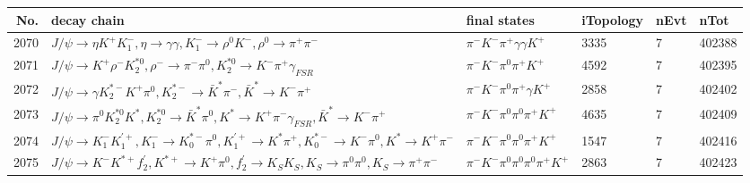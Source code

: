 \begin{table}[htbp] 
\begin{center}
\begin{small}
\begin{tabular}{rlllll}\hline\hline
 No. & decay chain & final states &  iTopology & nEvt & nTot \\\hline
2070&$J/\psi       \rightarrow \eta          K^{+}          K_{1}^{-}      , \eta           \rightarrow \gamma       \gamma       , K_{1}^{-}       \rightarrow \rho^{0}      K^{-}          , \rho^{0}       \rightarrow \pi^{+}        \pi^{-}        $&$\pi^{-}        K^{-}          \pi^{+}        \gamma       \gamma       K^{+}          $& 3335&    7&402388\\
2071&$J/\psi       \rightarrow K^{+}          \rho^{-}      K_2^{*0}       , \rho^{-}       \rightarrow \pi^{-}        \pi^{0}        , K_2^{*0}        \rightarrow K^{-}          \pi^{+}        \gamma_{FSR} $&$\pi^{-}        K^{-}          \pi^{0}        \pi^{+}        K^{+}          $& 4592&    7&402395\\
2072&$J/\psi       \rightarrow \gamma       K_2^{*-}       K^{+}          \pi^{0}        , K_2^{*-}        \rightarrow \bar{K}^{*}   \pi^{-}        , \bar{K}^{*}    \rightarrow K^{-}          \pi^{+}        $&$\pi^{-}        K^{-}          \pi^{0}        \pi^{+}        \gamma       K^{+}          $& 2858&    7&402402\\
2073&$J/\psi       \rightarrow \pi^{0}        K_2^{*0}       K^{*}          , K_2^{*0}        \rightarrow \bar{K}^{*}   \pi^{0}        , K^{*}           \rightarrow K^{+}          \pi^{-}        \gamma_{FSR} , \bar{K}^{*}    \rightarrow K^{-}          \pi^{+}        $&$\pi^{-}        K^{-}          \pi^{0}        \pi^{0}        \pi^{+}        K^{+}          $& 4635&    7&402409\\
2074&$J/\psi       \rightarrow K_{1}^{-}      K_1^{'+}      , K_{1}^{-}       \rightarrow K_{0}^{*-}     \pi^{0}        , K_1^{'+}       \rightarrow K^{*}          \pi^{+}        , K_{0}^{*-}      \rightarrow K^{-}          \pi^{0}        , K^{*}           \rightarrow K^{+}          \pi^{-}        $&$\pi^{-}        K^{-}          \pi^{0}        \pi^{0}        \pi^{+}        K^{+}          $& 1547&    7&402416\\
2075&$J/\psi       \rightarrow K^{-}          K^{*+}         f_2^{'}       , K^{*+}          \rightarrow K^{+}          \pi^{0}        , f_2^{'}        \rightarrow K_{S}          K_{S}          , K_{S}           \rightarrow \pi^{0}        \pi^{0}        , K_{S}           \rightarrow \pi^{+}        \pi^{-}        $&$\pi^{-}        K^{-}          \pi^{0}        \pi^{0}        \pi^{0}        \pi^{+}        K^{+}          $& 2863&    7&402423\\

\end{tabular}
\end{small}
\end{center}
\end{table}
